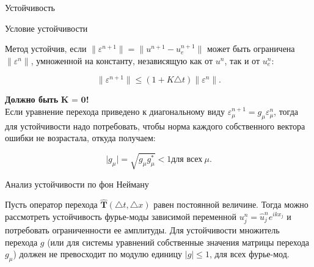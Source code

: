 \documentclass[10pt,xcolor=pst,aspectratio=169]{beamer}
\begin{document}
\begin{frame}{Устойчивость}

	\transdissolve[duration=0.1]
	\justifying
	\large

	\begin{block}{Условие устойчивости}

		Метод устойчив, если $\parallel \varepsilon^{n + 1} \parallel = \parallel u^{n + 1} - u^{n + 1}_{e} \parallel$ может быть ограничена $\parallel \varepsilon^{n} \parallel$, умноженной на константу, независящую как от $u^{n}$, так и от $ u^{n}_{e}$:

		\[
			\parallel \varepsilon^{n + 1} \parallel \leq \left( 1 + K \triangle t \right) \parallel \varepsilon^{n} \parallel.
		\]

	\end{block}

	\textbf{Должно быть} $\textbf{K = 0}$\textbf{!}\\

	Если уравнение перехода приведено к диагональному виду $\varepsilon^{n + 1}_{\mu} = g_{\mu} \varepsilon^{n}_{\mu}$, тогда для устойчивости надо потребовать, чтобы норма каждого собственного вектора ошибки не возрастала, откуда получаем:

	\[
		\vert g_{\mu} \vert = \sqrt{ g_{\mu}  g^{*}_{\mu}} < 1 \mbox{для всех} \: \mu.
	\]

\end{frame}

\begin{frame}{Анализ устойчивости по фон Нейману}

	\transdissolve[duration=0.1]
	\justifying
	\large

	Пусть оператор перехода $\hat{\textbf{T}} (\triangle t, \triangle x)$ равен постоянной величине. Тогда можно рассмотреть устойчивость фурье-моды зависимой переменной $u^{n}_{j} = \hat{u}^{n}_{j} e^{i k x_{j}}$ и потребовать ограниченности ее амплитуды. Для устойчивости множитель перехода $g$ (или для системы уравнений собственные значения матрицы перехода $g_{\mu}$) должен не превосходит по модулю единицу $\vert g \vert \leq 1$, для всех фурье-мод.\\

\end{frame}
\end{document}
